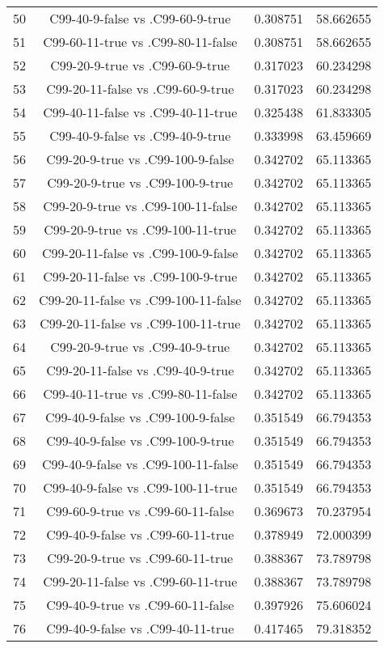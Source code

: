 \documentclass[a4paper,10pt]{article}
\begin{document}
\begin{landscape}
\begin{table}[!htp]
\begin{tabular}{cccc}
50&C99-40-9-false vs .C99-60-9-true&0.308751&58.662655\\
51&C99-60-11-true vs .C99-80-11-false&0.308751&58.662655\\
52&C99-20-9-true vs .C99-60-9-true&0.317023&60.234298\\
53&C99-20-11-false vs .C99-60-9-true&0.317023&60.234298\\
54&C99-40-11-false vs .C99-40-11-true&0.325438&61.833305\\
55&C99-40-9-false vs .C99-40-9-true&0.333998&63.459669\\
56&C99-20-9-true vs .C99-100-9-false&0.342702&65.113365\\
57&C99-20-9-true vs .C99-100-9-true&0.342702&65.113365\\
58&C99-20-9-true vs .C99-100-11-false&0.342702&65.113365\\
59&C99-20-9-true vs .C99-100-11-true&0.342702&65.113365\\
60&C99-20-11-false vs .C99-100-9-false&0.342702&65.113365\\
61&C99-20-11-false vs .C99-100-9-true&0.342702&65.113365\\
62&C99-20-11-false vs .C99-100-11-false&0.342702&65.113365\\
63&C99-20-11-false vs .C99-100-11-true&0.342702&65.113365\\
64&C99-20-9-true vs .C99-40-9-true&0.342702&65.113365\\
65&C99-20-11-false vs .C99-40-9-true&0.342702&65.113365\\
66&C99-40-11-true vs .C99-80-11-false&0.342702&65.113365\\
67&C99-40-9-false vs .C99-100-9-false&0.351549&66.794353\\
68&C99-40-9-false vs .C99-100-9-true&0.351549&66.794353\\
69&C99-40-9-false vs .C99-100-11-false&0.351549&66.794353\\
70&C99-40-9-false vs .C99-100-11-true&0.351549&66.794353\\
71&C99-60-9-true vs .C99-60-11-false&0.369673&70.237954\\
72&C99-40-9-false vs .C99-60-11-true&0.378949&72.000399\\
73&C99-20-9-true vs .C99-60-11-true&0.388367&73.789798\\
74&C99-20-11-false vs .C99-60-11-true&0.388367&73.789798\\
75&C99-40-9-true vs .C99-60-11-false&0.397926&75.606024\\
76&C99-40-9-false vs .C99-40-11-true&0.417465&79.318352\\

\end{tabular}
\end{table}
\end{landscape}
\end{document}
